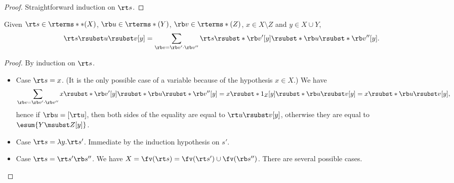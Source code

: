 	\begin{proof}
	Straightforward induction on $\rt s$.
	\end{proof}

\begin{lemma}
	Given $\rt s \in \rterms**(X)$,
	$\rb u \in \rterms*(Y)$,
	$\rb v \in \rterms*(Z)$,
	$x \in X \setminus Z$ and $y \in X \cup Y$,
	\[	\rt s \rsubst u \rsubst v [y] =
		\sum_{\rb v = \rb v' \cdot \rb v''} \rt s \rsubst* {\rb v'} [y]
		\rsubst*{ \rb u \rsubst* {\rb v''}[y] }. \]
\end{lemma}
	
	\begin{proof}
	By induction on $\rt s$.
	\begin{itemize}
	\item Case $\rt s = x$.
		(It is the only possible case of a variable
		because of the hypothesis $x \in X$.)
		We have
		\[	\sum_{\rb v = \rb v' \cdot \rb v''} x \rsubst* {\rb v'} [y]
				\rsubst*{ \rb u \rsubst* {\rb v''}[y] }
			= x \rsubst* {1_Z}[y] \rsubst*{\rb u \rsubst v[y]}
			= x \rsubst*{\rb u \rsubst v[y]}, \]
		hence if $\rb u = [\rt u]$, then
		both sides of the equality are equal to $\rt u \rsubst v[y]$,
		otherwise they are equal to $\esum{Y \msubst Z [y]}$.
	\item Case $\rt s = \ensuremath{\lambda}y.\rt s'$.
		Immediate by the induction hypothesis on $s'$.
	\item Case $\rt s = \rt s' \rb s''$.
		We have $X = \fv(\rt s) = \fv(\rt s') \cup \fv(\rb s'')$.
		There are several possible cases.

\end{itemize}
\end{proof}
